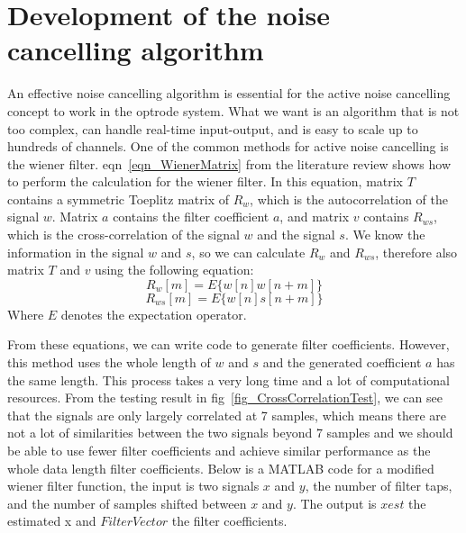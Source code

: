 \section{Development of the noise cancelling algorithm}

An effective noise cancelling algorithm is essential for the active noise cancelling concept to work in the optrode system.  What we want is an algorithm that is not too complex, can handle real-time input-output, and is easy to scale up to hundreds of channels.  One of the common methods for active noise cancelling is the wiener filter.  eqn~\ref{eqn_WienerMatrix} from the literature review shows how to perform the calculation for the wiener filter.  In this equation, matrix $T$ contains a symmetric Toeplitz matrix of $R_w$, which is the autocorrelation of the signal $w$.  Matrix $a$ contains the filter coefficient $a$, and matrix $v$ contains $R_{ws}$, which is the cross-correlation of the signal $w$ and the signal $s$.  We know the information in the signal $w$ and $s$, so we can calculate $R_w$ and $R_{ws}$, therefore also matrix $T$ and $v$ using the following equation:
$$R_w[m]=E\{w[n]w[n+m]\}$$
$$R_{ws}[m]=E\{w[n]s[n+m]\}$$
Where $E$ denotes the expectation operator.

From these equations, we can write code to generate filter coefficients.  However, this method uses the whole length of $w$ and $s$ and the generated coefficient $a$ has the same length.  This process takes a very long time and a lot of computational resources.  From the testing result in fig~\ref{fig_CrossCorrelationTest}, we can see that the signals are only largely correlated at 7 samples, which means there are not a lot of similarities between the two signals beyond 7 samples and we should be able to use fewer filter coefficients and achieve similar performance as the whole data length filter coefficients.  Below is a MATLAB code for a modified wiener filter function, the input is two signals $x$ and $y$, the number of filter taps, and the number of samples shifted between $x$ and $y$.  The output is $xest$ the estimated x and $FilterVector$ the filter coefficients.

